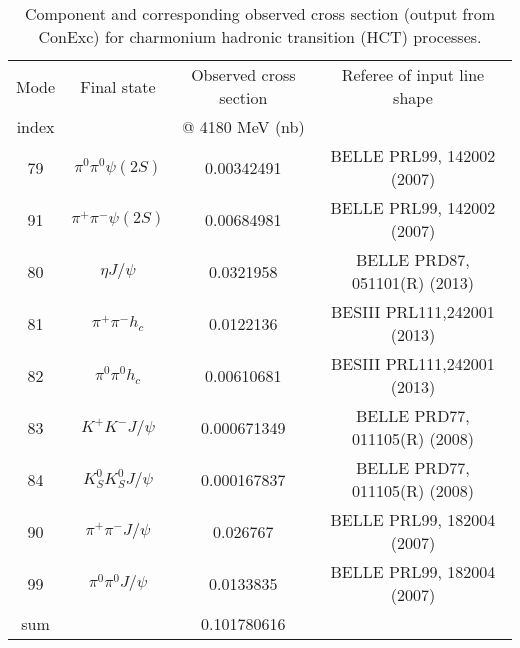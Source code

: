\documentclass[12pt,a4paper,oneside]{article}
\begin{document}
\begin{table}[htp]
\begin{center}
\caption{Component and corresponding observed cross section (output from ConExc) for
charmonium hadronic transition (HCT) processes.}
\begin{tabular}{c|c|c|c} \hline
Mode   & Final state       & Observed cross section & Referee of input line shape    \\
index  &                   & @ 4180 MeV (nb)        &                                \\
\hline 
79 &   $\pi^0 \pi^0 \psi(2S)$  & 0.00342491         & BELLE  PRL99, 142002 (2007)    \\
91 &   $\pi^+ \pi^- \psi(2S)$  & 0.00684981         & BELLE  PRL99, 142002 (2007)    \\
80 &   $\eta J/\psi$           & 0.0321958          & BELLE  PRD87, 051101(R) (2013) \\
81 &   $\pi^+ \pi^- h_c$       & 0.0122136          & BESIII PRL111,242001 (2013)    \\
82 &   $\pi^0 \pi^0 h_c$       & 0.00610681         & BESIII PRL111,242001 (2013)    \\
83 &   $K^+ K^- J/\psi$        & 0.000671349        & BELLE  PRD77, 011105(R) (2008) \\
84 &   $K_S^0 K_S^0 J/\psi$    & 0.000167837        & BELLE  PRD77, 011105(R) (2008) \\
90 &   $\pi^+ \pi^- J/\psi$    & 0.026767           & BELLE  PRL99, 182004 (2007)    \\
99 &   $\pi^0 \pi^0 J/\psi$    & 0.0133835          & BELLE  PRL99, 182004 (2007)    \\
\hline
sum &                          & 0.101780616       &                                 \\
\hline
\end{tabular}
\label{tab:HCT}
\end{center}
\end{table} 
\end{document}
